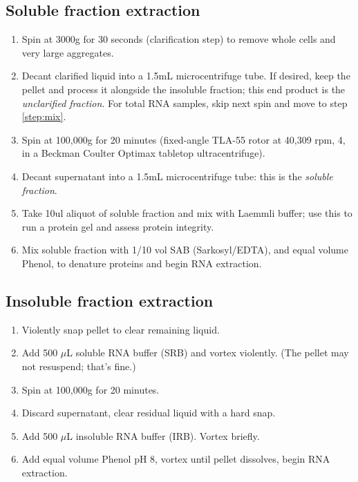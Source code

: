 \documentclass{article}
\newcommand{\mul}{\ensuremath{\mu}L\xspace}
\newcommand{\degC}{\celsius\xspace}
\begin{document}
\subsection*{Soluble fraction extraction}
\begin{enumerate}[resume]
  \item Spin at 3000g for 30 seconds (clarification step) to remove whole cells and very large aggregates.
  \item Decant clarified liquid into a 1.5mL microcentrifuge tube. If desired, keep the pellet and process it alongside the insoluble fraction; this end product is the \emph{unclarified fraction}. For total RNA samples, skip next spin and move to step \ref{step:mix}.
  \item Spin at 100,000g for 20 minutes (fixed-angle TLA-55 rotor at 40,309 rpm, 4\degC, in a Beckman Coulter Optimax tabletop ultracentrifuge).
  \item Decant supernatant into a 1.5mL microcentrifuge tube: this is the \emph{soluble fraction}. 
  \item Take 10ul aliquot of soluble fraction and mix with Laemmli buffer; use this to run a protein gel and assess protein integrity.
  \item Mix soluble fraction with 1/10 vol SAB (Sarkosyl/EDTA), and equal volume Phenol, to denature proteins and begin RNA extraction. \label{step:mix}
\end{enumerate}

\subsection*{Insoluble fraction extraction}
\begin{enumerate}[resume]
  \item Violently snap pellet to clear remaining liquid.
  \item Add 500 \mul soluble RNA buffer (SRB) and vortex violently. (The pellet may not resuspend; that's fine.)
  \item Spin at 100,000g for 20 minutes.
  \item Discard supernatant, clear residual liquid with a hard snap.
  \item Add 500 \mul insoluble RNA buffer (IRB). Vortex briefly.
 \item Add equal volume Phenol pH 8, vortex until pellet dissolves, begin RNA extraction.
\end{enumerate}
\end{document}
